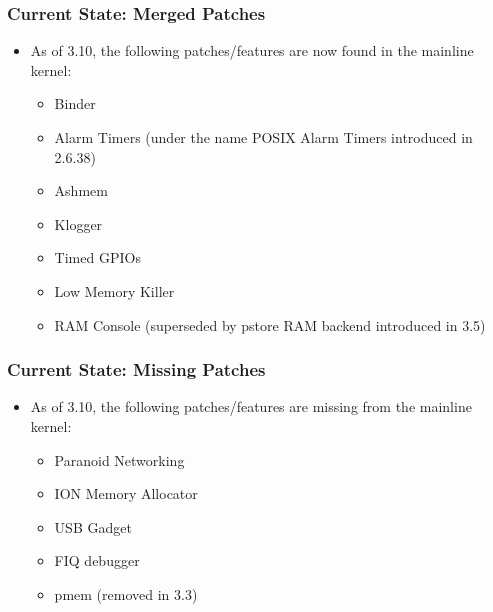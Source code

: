 \begin{frame}
  \frametitle{Current State: Merged Patches}
  \begin{itemize}
  \item As of 3.10, the following patches/features are now found in
    the mainline kernel:
    \begin{itemize}
    \item Binder
    \item Alarm Timers (under the name POSIX Alarm Timers introduced
      in 2.6.38)
    \item Ashmem
    \item Klogger
    \item Timed GPIOs
    \item Low Memory Killer
    \item RAM Console (superseded by pstore RAM backend introduced in
      3.5)
    \end{itemize}
  \end{itemize}
\end{frame}

\begin{frame}
  \frametitle{Current State: Missing Patches}
  \begin{itemize}
  \item As of 3.10, the following patches/features are missing from
    the mainline kernel:
    \begin{itemize}
    \item Paranoid Networking
    \item ION Memory Allocator
    \item USB Gadget
    \item FIQ debugger
    \item pmem (removed in 3.3)
    \end{itemize}
  \end{itemize}
\end{frame}

